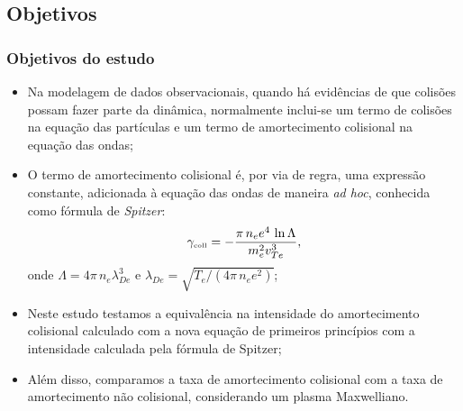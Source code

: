\documentclass[10pt,aspectratio=1610,lualatex]{beamer}
\begin{document}
\subsection*{Objetivos}
\begin{frame}
  \frametitle{Objetivos do estudo}
  \begin{itemize}
    \item Na modelagem de dados observacionais, quando há evidências
    de que colisões possam fazer parte da dinâmica, normalmente
    inclui-se um termo de colisões na equação das partículas e um
    termo de amortecimento colisional na equação das ondas;
    \vspace{0.1cm}
    \pause
    \item O termo de amortecimento colisional é, por via de regra,
    uma expressão constante, adicionada à equação das ondas de
    maneira \emph{ad hoc}, conhecida como fórmula de \emph{Spitzer}:
    \begin{displaymath}
      \gamma_{\mbox{\tiny coll}}=-\frac{\pi\, n_e e^4\,\ln \Lambda}{m_e^2v_{Te}^3},
    \end{displaymath}
    onde $\Lambda = 4\pi\,n_e\lambda_{De}^3$ e
    $\lambda_{De}=\sqrt{T_e/(4 \pi\, n_ee^2)}$;
    \vspace{0.1cm}
    \pause
    \item Neste estudo testamos a equivalência na intensidade do
    amortecimento colisional calculado com a nova equação de
    primeiros princípios com a intensidade calculada pela fórmula
    de Spitzer;
    \vspace{0.1cm}
    \pause
    \item Além disso, comparamos a taxa de amortecimento colisional
    com a taxa de amortecimento não colisional, considerando um
    plasma Maxwelliano.
  \end{itemize}
\end{frame}
\end{document}
